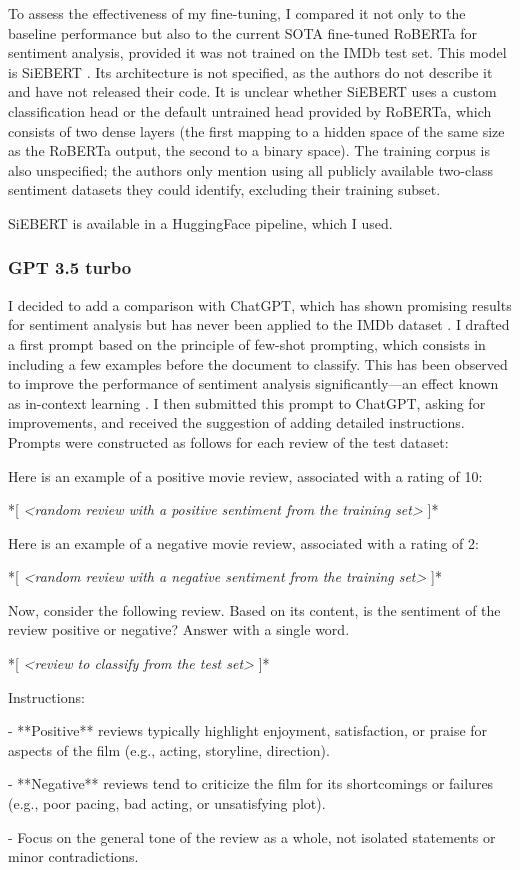 \documentclass{article}
\begin{document}
To assess the effectiveness of my fine-tuning, I compared it not only to the baseline performance but also to the current SOTA fine-tuned RoBERTa for sentiment analysis, provided it was not trained on the IMDb test set. This model is SiEBERT \citep{hartmann_more_2023}. Its architecture is not specified, as the authors do not describe it and have not released their code. It is unclear whether SiEBERT uses a custom classification head or the default untrained head provided by RoBERTa, which consists of two dense layers (the first mapping to a hidden space of the same size as the RoBERTa output, the second to a binary space). The training corpus is also unspecified; the authors only mention using all publicly available two-class sentiment datasets they could identify, excluding their training subset.

SiEBERT is available in a HuggingFace pipeline, which I used.

\subsubsection{GPT 3.5 turbo}

I decided to add a comparison with ChatGPT, which has shown promising results for sentiment analysis but has never been applied to the IMDb dataset \citep{wang_is_2024}. I drafted a first prompt based on the principle of few-shot prompting, which consists in including a few examples before the document to classify. This has been observed to improve the performance of sentiment analysis significantly—an effect known as in-context learning \citep{brown_language_2020}. I then submitted this prompt to ChatGPT, asking for improvements, and received the suggestion of adding detailed instructions. Prompts were constructed as follows for each review of the test dataset:

\begin{displayquote}
Here is an example of a positive movie review, associated with a rating of 10:

*[ \textit{<random review with a positive sentiment from the training set>} ]*

Here is an example of a negative movie review, associated with a rating of 2:

*[ \textit{<random review with a negative sentiment from the training set>} ]*

Now, consider the following review. Based on its content, is the sentiment of the review positive or negative? Answer with a single word.

*[ \textit{<review to classify from the test set>} ]*

Instructions:

- **Positive** reviews typically highlight enjoyment, satisfaction, or praise for aspects of the film (e.g., acting, storyline, direction).

- **Negative** reviews tend to criticize the film for its shortcomings or failures (e.g., poor pacing, bad acting, or unsatisfying plot).

- Focus on the general tone of the review as a whole, not isolated statements or minor contradictions.
\end{displayquote}
\end{document}
